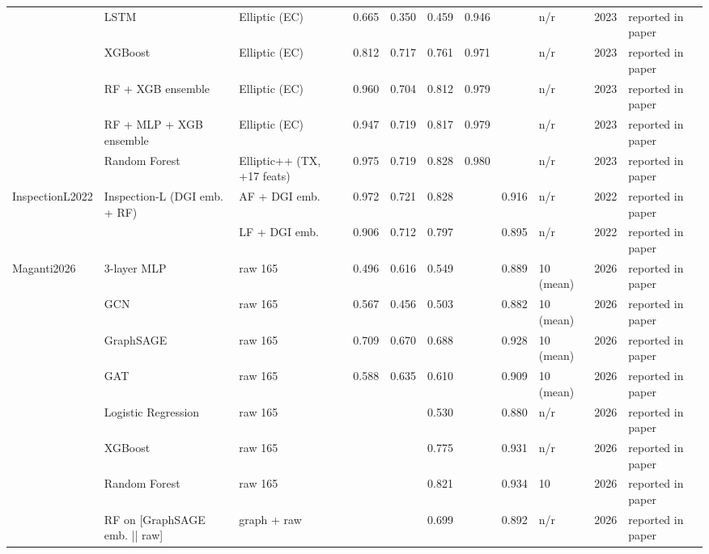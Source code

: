 \begin{table}
\begin{tabular}{lllllllllrl}
\cline{2-11}
 & LSTM & Elliptic (EC) & 0.665 & 0.350 & 0.459 & 0.946 &  & n/r & 2023 & reported in paper \\
\cline{2-11}
 & XGBoost & Elliptic (EC) & 0.812 & 0.717 & 0.761 & 0.971 &  & n/r & 2023 & reported in paper \\
\cline{2-11}
 & RF + XGB ensemble & Elliptic (EC) & 0.960 & 0.704 & 0.812 & 0.979 &  & n/r & 2023 & reported in paper \\
\cline{2-11}
 & RF + MLP + XGB ensemble & Elliptic (EC) & 0.947 & 0.719 & 0.817 & 0.979 &  & n/r & 2023 & reported in paper \\
\cline{2-11}
 & Random Forest & Elliptic++ (TX, +17 feats) & 0.975 & 0.719 & 0.828 & 0.980 &  & n/r & 2023 & reported in paper \\
\cline{1-11} \cline{2-11}
\multirow[t]{2}{*}{InspectionL2022} & \multirow[t]{2}{*}{Inspection-L (DGI emb. + RF)} & AF + DGI emb. & 0.972 & 0.721 & 0.828 &  & 0.916 & n/r & 2022 & reported in paper \\
 &  & LF + DGI emb. & 0.906 & 0.712 & 0.797 &  & 0.895 & n/r & 2022 & reported in paper \\
\cline{1-11} \cline{2-11}
\multirow[t]{8}{*}{Maganti2026} & 3-layer MLP & raw 165 & 0.496 & 0.616 & 0.549 &  & 0.889 & 10 (mean) & 2026 & reported in paper \\
\cline{2-11}
 & GCN & raw 165 & 0.567 & 0.456 & 0.503 &  & 0.882 & 10 (mean) & 2026 & reported in paper \\
\cline{2-11}
 & GraphSAGE & raw 165 & 0.709 & 0.670 & 0.688 &  & 0.928 & 10 (mean) & 2026 & reported in paper \\
\cline{2-11}
 & GAT & raw 165 & 0.588 & 0.635 & 0.610 &  & 0.909 & 10 (mean) & 2026 & reported in paper \\
\cline{2-11}
 & Logistic Regression & raw 165 &  &  & 0.530 &  & 0.880 & n/r & 2026 & reported in paper \\
\cline{2-11}
 & XGBoost & raw 165 &  &  & 0.775 &  & 0.931 & n/r & 2026 & reported in paper \\
\cline{2-11}
 & Random Forest & raw 165 &  &  & 0.821 &  & 0.934 & 10 & 2026 & reported in paper \\
\cline{2-11}
 & RF on [GraphSAGE emb. || raw] & graph + raw &  &  & 0.699 &  & 0.892 & n/r & 2026 & reported in paper \\
\cline{1-11} \cline{2-11}
\bottomrule
\end{tabular}
\end{table}
